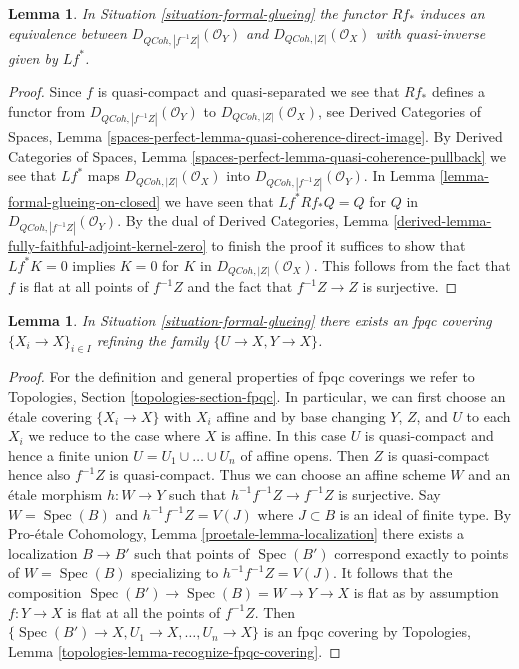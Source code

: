 \documentclass{stacks-project}
\theoremstyle{plain}
\newtheorem{lemma}[subsection]{Lemma}
\theoremstyle{definition}
\theoremstyle{remark}
\numberwithin{equation}{subsection}
\def\Spec{\mathop{\mathrm{Spec}}}
\def\QCoh{\mathit{QCoh}}
\begin{document}
\begin{lemma}
\label{lemma-derived-equivalent}
In Situation \ref{situation-formal-glueing} the functor
$Rf_*$ induces an equivalence between $D_{\QCoh, |f^{-1}Z|}(\mathcal{O}_Y)$
and $D_{\QCoh, |Z|}(\mathcal{O}_X)$ with quasi-inverse given by
$Lf^*$.
\end{lemma}

\begin{proof}
Since $f$ is quasi-compact and quasi-separated we see that $Rf_*$
defines a functor from $D_{\QCoh, |f^{-1}Z|}(\mathcal{O}_Y)$
to $D_{\QCoh, |Z|}(\mathcal{O}_X)$, see
Derived Categories of Spaces, Lemma
\ref{spaces-perfect-lemma-quasi-coherence-direct-image}.
By Derived Categories of Spaces, Lemma
\ref{spaces-perfect-lemma-quasi-coherence-pullback}
we see that $Lf^*$ maps $D_{\QCoh, |Z|}(\mathcal{O}_X)$
into $D_{\QCoh, |f^{-1}Z|}(\mathcal{O}_Y)$.
In Lemma \ref{lemma-formal-glueing-on-closed} we have seen that
$Lf^*Rf_*Q = Q$ for $Q$ in $D_{\QCoh, |f^{-1}Z|}(\mathcal{O}_Y)$.
By the dual of Derived Categories, Lemma
\ref{derived-lemma-fully-faithful-adjoint-kernel-zero}
to finish the proof it suffices to show that $Lf^*K = 0$
implies $K = 0$ for $K$ in $D_{\QCoh, |Z|}(\mathcal{O}_X)$.
This follows from the fact that $f$ is flat at all points of
$f^{-1}Z$ and the fact that $f^{-1}Z \to Z$ is surjective.
\end{proof}

\begin{lemma}
\label{lemma-dominate-by-fpqc-covering}
In Situation \ref{situation-formal-glueing} there exists an
fpqc covering $\{X_i \to X\}_{i \in I}$ refining the
family $\{U \to X, Y \to X\}$.
\end{lemma}

\begin{proof}
For the definition and general properties of fpqc coverings we refer to
Topologies, Section \ref{topologies-section-fpqc}. In particular, we can
first choose an \'etale covering $\{X_i \to X\}$ with $X_i$ affine and by
base changing $Y$, $Z$, and $U$ to each $X_i$ we reduce to the case where
$X$ is affine. In this case $U$ is quasi-compact and hence a finite union
$U = U_1 \cup \ldots \cup U_n$ of affine opens. 
Then $Z$ is quasi-compact hence also $f^{-1}Z$ is quasi-compact.
Thus we can choose an affine scheme $W$ and an \'etale morphism
$h : W \to Y$ such that $h^{-1}f^{-1}Z \to f^{-1}Z$ is surjective.
Say $W = \Spec(B)$ and $h^{-1}f^{-1}Z = V(J)$ where $J \subset B$
is an ideal of finite type.
By Pro-\'etale Cohomology, Lemma \ref{proetale-lemma-localization}
there exists a localization $B \to B'$ such that points of
$\Spec(B')$ correspond exactly to points of $W = \Spec(B)$
specializing to $h^{-1}f^{-1}Z = V(J)$. It follows that the
composition $\Spec(B') \to \Spec(B) = W \to Y \to X$ is flat
as by assumption $f : Y \to X$ is flat at all the points of $f^{-1}Z$. Then
$\{\Spec(B') \to X, U_1 \to X, \ldots, U_n \to X\}$
is an fpqc covering by
Topologies, Lemma \ref{topologies-lemma-recognize-fpqc-covering}.
\end{proof}
\end{document}
